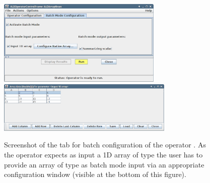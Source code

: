 \begin{center}
\begin{figure}[t]
\begin{center}
\hspace*{-3.0cm}
\includegraphics[width=0.7\textwidth]{../images/screenShotALDArrayMeanBatchConfig.png}\\[-1cm]
\hspace*{1cm}
\includegraphics[width=0.75\textwidth]{../images/screenShotALDArrayMeanBatchConfigValues.png}
\vspace*{-0.25cm}
\caption{\label{fig:batchConfig}Screenshot of the tab for batch configuration of
the operator . As the operator expects as input a 1D array
of type  the user has to provide an array of type
 as batch mode input via an appropriate configuration window
(visible at the bottom of this figure).}
\end{center}
\end{figure}
\end{center}


